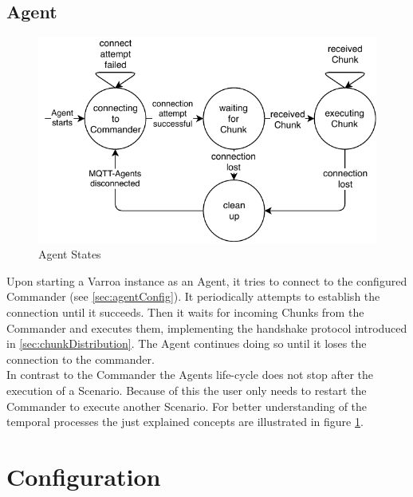 \subsection{Agent}
\begin{figure}[H]
	\begin{center}
	\includegraphics[scale=0.9]{Resources/PDF/AgentStates}
	\caption{Agent States}
	\label{pic:AgentStates}
	\end{center}
\end{figure}
Upon starting a Varroa instance as an Agent, it tries to connect to the configured Commander (see \ref{sec:agentConfig}).
It periodically attempts to establish the connection until it succeeds.
Then it waits for incoming Chunks from the Commander and executes them, implementing the handshake protocol introduced in \ref{sec:chunkDistribution}.
The Agent continues doing so until it loses the connection to the commander.\\
In contrast to the Commander the Agents life-cycle does not stop after the execution of a Scenario.
Because of this the user only needs to restart the Commander to execute another Scenario.
For better understanding of the temporal processes the just explained concepts are illustrated in figure \ref{pic:AgentStates}.

\section{Configuration}
